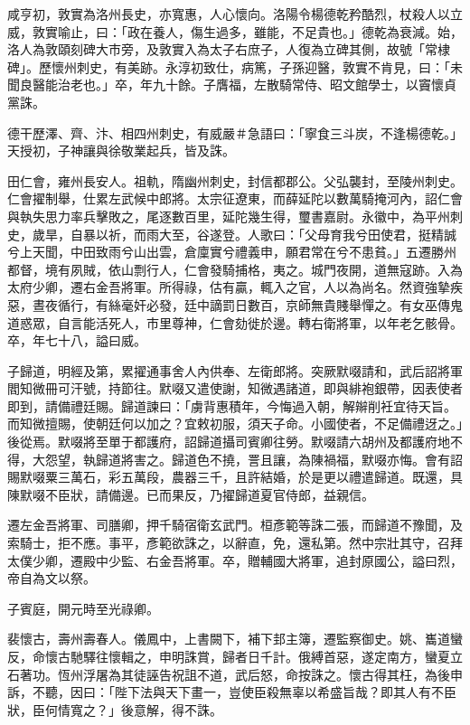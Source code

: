 \begin{pinyinscope}
 咸亨初，敦實為洛州長史，亦寬惠，人心懷向。洛陽令楊德乾矜酷烈，杖殺人以立威，敦實喻止，曰：「政在養人，傷生過多，雖能，不足貴也。」德乾為衰減。始，洛人為敦頤刻碑大市旁，及敦實入為太子右庶子，人復為立碑其側，故號「常棣碑」。歷懷州刺史，有美跡。永淳初致仕，病篤，子孫迎醫，敦實不肯見，曰：「未聞良醫能治老也。」卒，年九十餘。子膺福，左散騎常侍、昭文館學士，以竇懷貞黨誅。



 德干歷澤、齊、汴、相四州刺史，有威嚴＃急語曰：「寧食三斗炭，不逢楊德乾。」天授初，子神讓與徐敬業起兵，皆及誅。



 田仁會，雍州長安人。祖軌，隋幽州刺史，封信都郡公。父弘襲封，至陵州刺史。仁會擢制舉，仕累左武候中郎將。太宗征遼東，而薛延陀以數萬騎掩河內，詔仁會與執失思力率兵擊敗之，尾逐數百里，延陀幾生得，璽書嘉尉。永徽中，為平州刺史，歲旱，自暴以祈，而雨大至，谷遂登。人歌曰：「父母育我兮田使君，挺精誠兮上天聞，中田致雨兮山出雲，倉廩實兮禮義申，願君常在兮不患貧。」五遷勝州都督，境有夙賊，依山剽行人，仁會發騎捕格，夷之。城門夜開，道無寇跡。入為太府少卿，遷右金吾將軍。所得祿，估有贏，輒入之官，人以為尚名。然資強摯疾惡，晝夜循行，有絲毫奸必發，廷中謫罰日數百，京師無貴賤舉憚之。有女巫傳鬼道惑眾，自言能活死人，市里尊神，仁會劾徙於邊。轉右衛將軍，以年老乞骸骨。卒，年七十八，謚曰威。



 子歸道，明經及第，累擢通事舍人內供奉、左衛郎將。突厥默啜請和，武后詔將軍閻知微冊可汗號，持節往。默啜又遣使謝，知微遇諸道，即與緋袍銀帶，因表使者即到，請備禮廷賜。歸道諫曰：「虜背惠積年，今悔過入朝，解辮削衽宜待天旨。而知微擅賜，使朝廷何以加之？宜敕初服，須天子命。小國使者，不足備禮迓之。」後從焉。默啜將至單于都護府，詔歸道攝司賓卿往勞。默啜請六胡州及都護府地不得，大怨望，執歸道將害之。歸道色不撓，詈且讓，為陳禍福，默啜亦悔。會有詔賜默啜粟三萬石，彩五萬段，農器三千，且許結婚，於是更以禮遣歸道。既還，具陳默啜不臣狀，請備邊。已而果反，乃擢歸道夏官侍郎，益親信。



 遷左金吾將軍、司膳卿，押千騎宿衛玄武門。桓彥範等誅二張，而歸道不豫聞，及索騎士，拒不應。事平，彥範欲誅之，以辭直，免，還私第。然中宗壯其守，召拜太僕少卿，遷殿中少監、右金吾將軍。卒，贈輔國大將軍，追封原國公，謚曰烈，帝自為文以祭。



 子賓庭，開元時至光祿卿。



 裴懷古，壽州壽春人。儀鳳中，上書闕下，補下邽主簿，遷監察御史。姚、巂道蠻反，命懷古馳驛往懷輯之，申明誅賞，歸者日千計。俄縛首惡，遂定南方，蠻夏立石著功。恆州浮屠為其徒誣告祝詛不道，武后怒，命按誅之。懷古得其枉，為後申訴，不聽，因曰：「陛下法與天下畫一，豈使臣殺無辜以希盛旨哉？即其人有不臣狀，臣何情寬之？」後意解，得不誅。




\end{pinyinscope}
